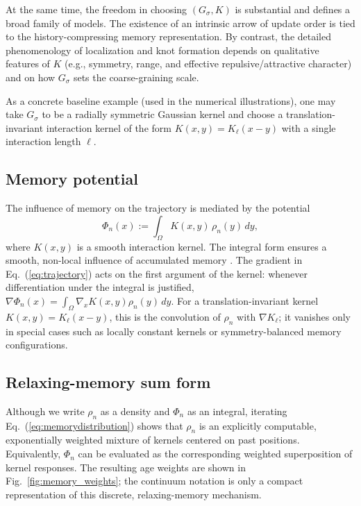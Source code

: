 \documentclass[reprint,amsmath,amssymb,aps,prd,nofootinbib,floatfix]{revtex4-2}
\begin{document}
At the same time, the freedom in choosing $(G_\sigma,K)$ is substantial and defines a broad family of models. The existence of an intrinsic arrow of update order is tied to the history-compressing memory representation. By contrast, the detailed phenomenology of localization and knot formation depends on qualitative features of $K$ (e.g., symmetry, range, and effective repulsive/attractive character) and on how $G_\sigma$ sets the coarse-graining scale.

As a concrete baseline example (used in the numerical illustrations), one may take $G_\sigma$ to be a radially symmetric Gaussian kernel and choose a translation-invariant interaction kernel of the form $K(x,y)=K_\ell(x-y)$ with a single interaction length $\ell$.

\subsection{Memory potential}

The influence of memory on the trajectory is mediated by the potential
\begin{equation}\label{eq:memorypotential}
\Phi_n(x) := \int_\Omega K(x,y)\,\rho_n(y)\,dy,
\end{equation}
where $K(x,y)$ is a smooth interaction kernel. 
The integral form ensures a smooth, non-local influence of accumulated memory \cite{Mori1965,Zwanzig2001}.
The gradient in Eq.~(\ref{eq:trajectory}) acts on the first argument of the kernel: whenever differentiation under the integral is justified, $\nabla\Phi_n(x)=\int_\Omega \nabla_x K(x,y)\rho_n(y)\,dy$.
For a translation-invariant kernel $K(x,y)=K_\ell(x-y)$, this is the convolution of $\rho_n$ with $\nabla K_\ell$; it vanishes only in special cases such as locally constant kernels or symmetry-balanced memory configurations.

\subsection{Relaxing-memory sum form}

Although we write $\rho_n$ as a density and $\Phi_n$ as an integral, iterating Eq.~(\ref{eq:memorydistribution}) shows that $\rho_n$ is an explicitly computable, exponentially weighted mixture of kernels centered on past positions.
Equivalently, $\Phi_n$ can be evaluated as the corresponding weighted superposition of kernel responses.
The resulting age weights are shown in Fig.~\ref{fig:memory_weights}; the continuum notation is only a compact representation of this discrete, relaxing-memory mechanism.
\end{document}
